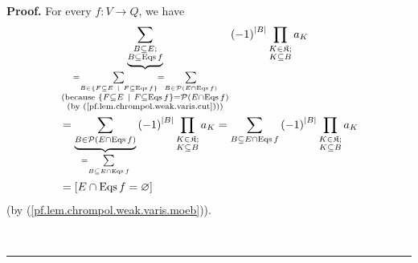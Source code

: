 \documentclass[numbers=enddot,12pt,final,onecolumn,notitlepage]{scrartcl}%
\theoremstyle{definition}
\newenvironment{proof}[1][Proof]{\noindent\textbf{#1.} }{\ \rule{0.5em}{0.5em}}
\newenvironment{verlong}{}{}
\let\sumnonlimits\sum
\let\prodnonlimits\prod
\renewcommand{\sum}{\sumnonlimits\limits}
\renewcommand{\prod}{\prodnonlimits\limits}
\begin{document}
\begin{verlong}
\begin{proof}
For every $f:V\rightarrow Q$, we have%
\begin{align}
&  \underbrace{\sum_{\substack{B\subseteq E;\\B\subseteq\operatorname*{Eqs}%
f}}}_{\substack{=\sum_{B\in\left\{  F\subseteq E\ \mid\ F\subseteq
\operatorname*{Eqs}f\right\}  }=\sum_{B\in\mathcal{P}\left(  E\cap
\operatorname*{Eqs}f\right)  }\\\text{(because }\left\{  F\subseteq
E\ \mid\ F\subseteq\operatorname*{Eqs}f\right\}  =\mathcal{P}\left(
E\cap\operatorname*{Eqs}f\right)  \\\text{(by
(\ref{pf.lem.chrompol.weak.varis.cut})))}}}\left(  -1\right)  ^{\left\vert
B\right\vert }\prod_{\substack{K\in\mathfrak{K};\\K\subseteq B}}a_{K}%
\nonumber\\
&  =\underbrace{\sum_{B\in\mathcal{P}\left(  E\cap\operatorname*{Eqs}f\right)
}}_{=\sum_{B\subseteq E\cap\operatorname*{Eqs}f}}\left(  -1\right)
^{\left\vert B\right\vert }\prod_{\substack{K\in\mathfrak{K};\\K\subseteq
B}}a_{K}=\sum_{B\subseteq E\cap\operatorname*{Eqs}f}\left(  -1\right)
^{\left\vert B\right\vert }\prod_{\substack{K\in\mathfrak{K};\\K\subseteq
B}}a_{K}\nonumber\\
&  =\left[  E\cap\operatorname*{Eqs}f=\varnothing\right]
\label{pf.lem.chrompol.weak.varis.moeb2}%
\end{align}
(by (\ref{pf.lem.chrompol.weak.varis.moeb})).


\end{proof}
\end{verlong}
\end{document}
